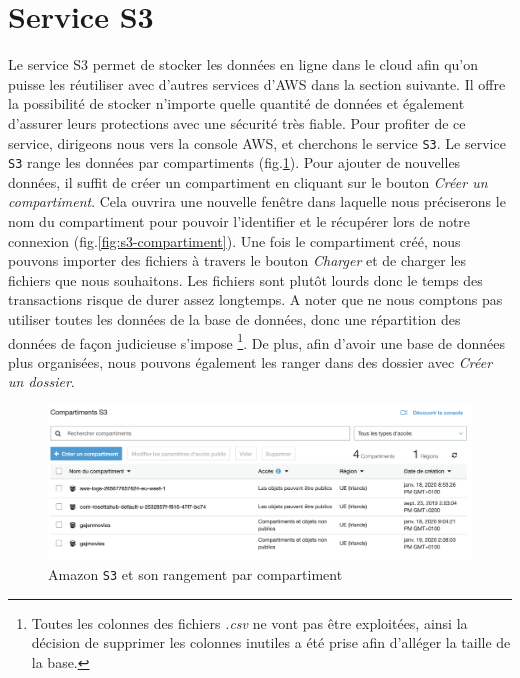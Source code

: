 \documentclass[a4paper, 12pt, oneside]{book}
\begin{document}
\section{Service S3}
Le service S3 permet de stocker les données en ligne dans le cloud afin qu'on puisse les réutiliser avec d'autres services d'AWS dans la section suivante. Il offre la possibilité de stocker n'importe quelle quantité de données et également d'assurer leurs protections avec une sécurité très fiable. Pour profiter de ce service, dirigeons nous vers la console AWS, et cherchons le service \texttt{S3}.
\newline
Le service \texttt{S3} range les données par compartiments (fig.\ref{fig:s3-home}). Pour ajouter de nouvelles données, il suffit de créer un compartiment en cliquant sur le bouton \textit{Créer un compartiment}. Cela ouvrira une nouvelle fenêtre dans laquelle nous préciserons le nom du compartiment pour pouvoir l'identifier et le récupérer lors de notre connexion (fig.\ref{fig:s3-compartiment}). Une fois le compartiment créé, nous pouvons importer des fichiers à travers le bouton \textit{Charger} et de charger les fichiers que nous souhaitons. Les fichiers sont plutôt lourds donc le temps des transactions risque de durer assez longtemps. A noter que ne nous comptons pas utiliser toutes les données de la base de données, donc une répartition des données de façon judicieuse s'impose \footnote{Toutes les colonnes des fichiers \textit{.csv} ne vont pas être exploitées, ainsi la décision de supprimer les colonnes inutiles a été prise afin d'alléger la taille de la base.}. De plus, afin d'avoir une base de données plus organisées, nous pouvons également les ranger dans des dossier avec \textit{Créer un dossier}.

\begin{figure}[H]
  \centering
  \includegraphics[width=1.0\textwidth]{images/s3-home}
  \caption{Amazon \texttt{S3} et son rangement par compartiment}
  \label{fig:s3-home}
\end{figure}
\end{document}
